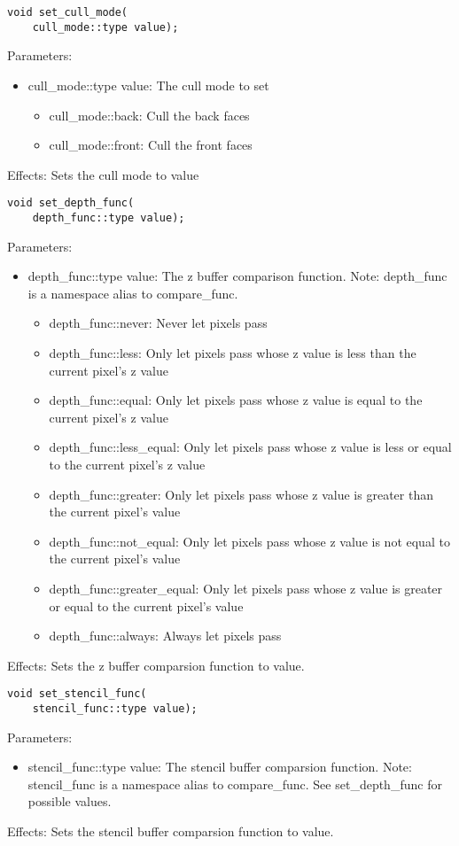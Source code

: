 \documentclass{article}
\begin{document}
\begin{lstlisting}
void set_cull_mode(
	cull_mode::type value);
\end{lstlisting}
Parameters:
\begin{itemize}
\item cull\_mode::type value: The cull mode to set
  \begin{itemize}
  \item cull\_mode::back: Cull the back faces
  \item cull\_mode::front: Cull the front faces
  \end{itemize}
\end{itemize}
Effects: Sets the cull mode to value

\begin{lstlisting}
void set_depth_func(
	depth_func::type value);
\end{lstlisting}
Parameters:
\begin{itemize}
\item depth\_func::type value: The z buffer comparison function.
  Note: depth\_func is a namespace alias to compare\_func.
  \begin{itemize}
  \item depth\_func::never: Never let pixels pass
  \item depth\_func::less: Only let pixels pass whose z value is less than the current pixel's z value
  \item depth\_func::equal: Only let pixels pass whose z value is equal to the current pixel's z value
  \item depth\_func::less\_equal: Only let pixels pass whose z value is less or equal to the current pixel's z value
  \item depth\_func::greater: Only let pixels pass whose z value is greater than the current pixel's value
  \item depth\_func::not\_equal: Only let pixels pass whose z value is not equal to the current pixel's value
  \item depth\_func::greater\_equal: Only let pixels pass whose z value is greater or equal to the current pixel's value
  \item depth\_func::always: Always let pixels pass
  \end{itemize}
\end{itemize}
Effects: Sets the z buffer comparsion function to value.

\begin{lstlisting}
void set_stencil_func(
	stencil_func::type value);
\end{lstlisting}
Parameters:
\begin{itemize}
\item stencil\_func::type value: The stencil buffer comparsion function.
  Note: stencil\_func is a namespace alias to compare\_func. See set\_depth\_func for possible values.
\end{itemize}
Effects: Sets the stencil buffer comparsion function to value.
\end{document}
